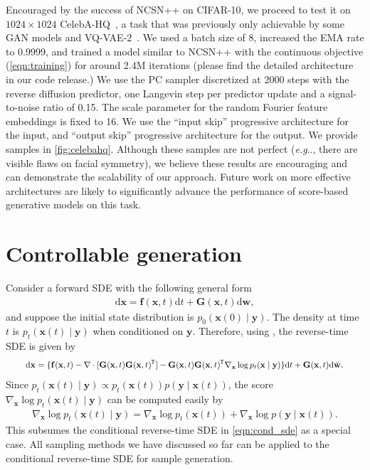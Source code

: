 \documentclass{article} \usepackage{iclr2021_conference,times}
\makeatletter
\newcommand*{\tran}{^{\mkern-1.5mu\mathsf{T}}}
\newcommand{\mbf}[1]{\mathbf{#1}}
\newcommand{\ud}{\mathrm{d}}
\def\@onedot{\ifx\@let@token.\else.\null\fi\xspace}
\DeclareRobustCommand\onedot{\futurelet\@let@token\@onedot}
\newcommand{\bfx}{\mathbf{x}}
\newcommand{\bfw}{\mathbf{w}}
\newcommand{\bff}{\mathbf{f}}
\newcommand{\bfy}{\mathbf{y}}
\newcommand{\bfG}{\mathbf{G}}
\def\eg{\emph{e.g}\onedot}
\makeatother
\begin{document}
Encouraged by the success of NCSN++ on CIFAR-10, we proceed to test it on $1024\times 1024$ CelebA-HQ~\citep{karras2018progressive}, a task that was previously only achievable by some GAN models and VQ-VAE-2~\citep{razavi2019generating}. We used a batch size of 8, increased the EMA rate to 0.9999, and trained a model similar to NCSN++ with the continuous objective (\cref{eqn:training}) for around 2.4M iterations (please find the detailed architecture in our code release.) We use the PC sampler discretized at 2000 steps with the reverse diffusion predictor, one Langevin step per predictor update and a signal-to-noise ratio of 0.15. The scale parameter for the random Fourier feature embeddings is fixed to 16. We use the ``input skip'' progressive architecture for the input, and ``output skip'' progressive architecture for the output. We provide samples in \cref{fig:celebahq}. Although these samples are not perfect (\eg, there are visible flaws on facial symmetry), we believe these results are encouraging and can demonstrate the scalability of our approach. Future work on more effective architectures are likely to significantly advance the performance of score-based generative models on this task.


\section{Controllable generation}\label{app:cond_gen}
Consider a forward SDE with the following general form
\begin{align*}
     \ud \bfx = \bff(\bfx, t) \ud t + \mbf{G}(\bfx, t) \ud \bfw,
\end{align*}
and suppose the initial state distribution is $p_0(\bfx(0) \mid \bfy)$. The density at time $t$ is $p_t(\bfx(t) \mid \bfy)$ when conditioned on $\bfy$. Therefore, using \citet{Anderson1982-ny}, the reverse-time SDE is given by
\begin{align}
\resizebox{0.92\linewidth}{!}{$\displaystyle \ud \bfx = \{\bff(\bfx, t) - \nabla \cdot [\bfG(\bfx, t) \bfG(\bfx,t)\tran] - \bfG(\bfx,t)\bfG(\bfx,t)\tran  \nabla_\bfx  \log p_t(\bfx \mid \bfy)\} \ud t + \mbf{G}(\bfx, t) \ud \bar{\bfw}$} \label{eqn:cond_sde_2}.
\end{align}
Since $p_t(\bfx(t) \mid \bfy) \propto p_t(\bfx(t)) p(\bfy \mid \bfx(t))$, the score $\nabla_\bfx \log p_t(\bfx(t) \mid \bfy)$ can be computed easily by
\begin{align}
    \nabla_{\bfx} \log p_t(\bfx(t) \mid \bfy) = \nabla_{\bfx} \log p_t(\bfx(t)) + \nabla_{\bfx} \log p(\bfy \mid \bfx(t)).
\end{align}
This subsumes the conditional reverse-time SDE in \cref{eqn:cond_sde} as a special case. All sampling methods we have discussed so far can be applied to the conditional reverse-time SDE for sample generation.
\end{document}
